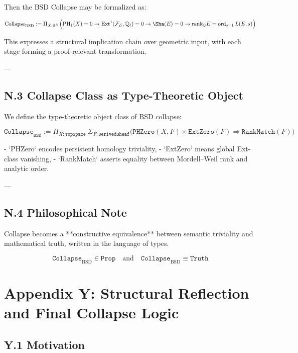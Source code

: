 Then the BSD Collapse may be formalized as:

\[
\mathrm{Collapse}_{\mathrm{BSD}} := 
\Pi_{X : \mathbb{R}^N} \Big(
\mathrm{PH}_1(X) = 0 \to 
\mathrm{Ext}^1(\mathcal{F}_E, \mathbb{Q}_\ell) = 0 \to 
\Sha(E) = 0 \to 
\mathrm{rank}_\mathbb{Q} E = \operatorname{ord}_{s=1} L(E,s)
\Big)
\]

This expresses a structural implication chain over geometric input,  
with each stage forming a proof-relevant transformation.

---

\subsection*{N.3 Collapse Class as Type-Theoretic Object}

We define the type-theoretic object class of BSD collapse:

\[
\texttt{Collapse}_{\texttt{BSD}} := 
\Pi_{X : \texttt{TopSpace}} \ \Sigma_{F : \texttt{DerivedSheaf}} \Big(
\texttt{PHZero}(X, F) \times \texttt{ExtZero}(F) \Rightarrow \texttt{RankMatch}(F)
\Big)
\]

- `PHZero` encodes persistent homology triviality,
- `ExtZero` means global Ext-class vanishing,
- `RankMatch` asserts equality between Mordell–Weil rank and analytic order.

---

\subsection*{N.4 Philosophical Note}

Collapse becomes a **constructive equivalence** between  
semantic triviality and mathematical truth, written in the language of types.

\[
\boxed{
\texttt{Collapse}_{\mathrm{BSD}} \in \texttt{Prop}
}
\quad \text{and} \quad
\texttt{Collapse}_{\mathrm{BSD}} \equiv \texttt{Truth}
\]



\section*{Appendix Y: Structural Reflection and Final Collapse Logic}

\subsection*{Y.1 Motivation}

